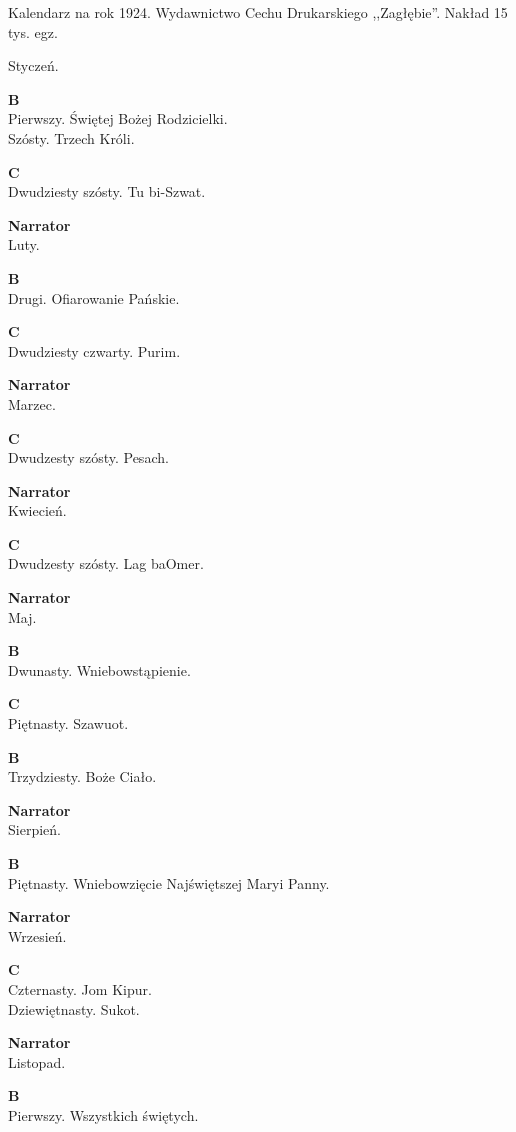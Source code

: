 \documentclass[11pt,a4paper,oneside]{article}
\begin{document}
Kalendarz na rok 1924. Wydawnictwo Cechu Drukarskiego ,,Zagłębie''.
Nakład 15 tys. egz. 

Styczeń.

\textbf{B}\\
Pierwszy. Świętej Bożej Rodzicielki. \\
Szósty. Trzech Króli.

\textbf{C}\\
Dwudziesty szósty. Tu bi-Szwat. %

\textbf{Narrator}\\
Luty.

\textbf{B}\\
Drugi. Ofiarowanie Pańskie.

\textbf{C}\\
Dwudziesty czwarty. Purim.

\textbf{Narrator}\\
Marzec.

\textbf{C}\\
Dwudzesty szósty. Pesach.

\textbf{Narrator}\\
Kwiecień.

\textbf{C}\\
Dwudzesty szósty. Lag baOmer.

\textbf{Narrator}\\
Maj.

\textbf{B}\\
Dwunasty. Wniebowstąpienie.

\textbf{C}\\
Piętnasty. Szawuot.

\textbf{B}\\
Trzydziesty. Boże Ciało.

\textbf{Narrator}\\
Sierpień.

\textbf{B}\\
Piętnasty. Wniebowzięcie Najświętszej Maryi Panny.

\textbf{Narrator}\\
Wrzesień.

\textbf{C}\\
Czternasty. Jom Kipur.\\
Dziewiętnasty. Sukot.

\textbf{Narrator}\\
Listopad.

\textbf{B}\\
Pierwszy. Wszystkich świętych.
\end{document}
